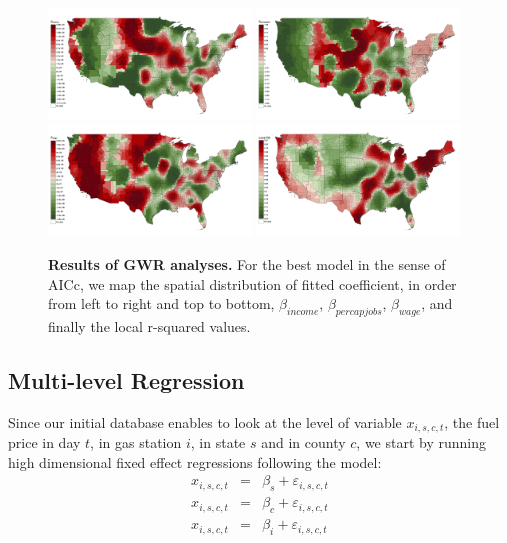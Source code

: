\documentclass[3p,times,procedia]{elsarticle}
\begin{document}
\begin{figure}
\centering
\includegraphics[width=0.48\textwidth]{figures/gwr_allbest_betaincome}
\includegraphics[width=0.48\textwidth]{figures/gwr_allbest_betapercapjobs}\\
\includegraphics[width=0.48\textwidth]{figures/gwr_allbest_wage}
\includegraphics[width=0.48\textwidth]{figures/gwr_allbest_LocalR2}
\caption{\textbf{Results of GWR analyses.} For the best model in the sense of AICc, we map the spatial distribution of fitted coefficient, in order from left to right and top to bottom, $\beta_{income}$, $\beta_{percapjobs}$, $\beta_{wage}$, and finally the local r-squared values.}
\label{fig:gwr}
\end{figure}

\subsection{Multi-level Regression}

Since our initial database enables to look at the level of variable $x_{i,s,c,t}$, the fuel price in day $t$, in gas station $i$, in state $s$ and in county $c$, we start by running high dimensional fixed effect regressions following the model:
\begin{eqnarray}
x_{i,s,c,t} &=& \beta_s + \varepsilon_{i,s,c,t} \\
x_{i,s,c,t} &=& \beta_c + \varepsilon_{i,s,c,t} \\
x_{i,s,c,t} &=& \beta_i + \varepsilon_{i,s,c,t}
\end{eqnarray}
\end{document}
